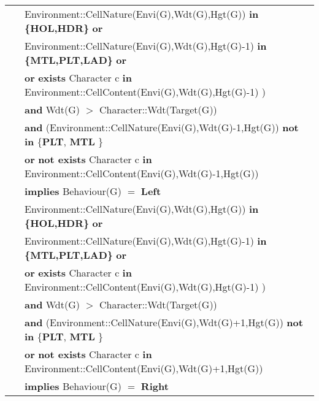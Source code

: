 \documentclass{article}
\begin{document}
\begin{tabular}{rl}
& \textrm{Environment::CellNature(Envi(G),Wdt(G),Hgt(G))} \textbf{in} \textbf{ \{HOL,HDR\}} \textbf{or}  \\
& \quad \textrm{Environment::CellNature(Envi(G),Wdt(G),Hgt(G)-1)} \textbf{in} \textbf{\{MTL,PLT,LAD\}} \textbf{or}  \\
& \quad \textbf{or} \textbf{exists} \textrm{Character} c \textbf{in} \textrm{Environment::CellContent(Envi(G),Wdt(G),Hgt(G)-1)} ) \\\

& \quad\quad \textbf{and} \textrm{Wdt(G)} $>$ \textrm{Character::Wdt(Target(G))} \\
& \quad\quad \textbf{and} (\textrm{Environment::CellNature(Envi(G),Wdt(G)-1,Hgt(G))} \textbf{not in} \{\textbf{PLT}, \textbf{MTL}  \} \\
& \quad\quad\quad\quad \textbf{or} \textbf{not exists} \textrm{Character} c \textbf{in} \textrm{Environment::CellContent(Envi(G),Wdt(G)-1,Hgt(G))} \\
& \quad\quad \textbf{implies} \textrm{Behaviour(G)} $=$ \textbf{Left} \\


& \textrm{Environment::CellNature(Envi(G),Wdt(G),Hgt(G))} \textbf{in} \textbf{ \{HOL,HDR\}} \textbf{or}  \\

& \quad \textrm{Environment::CellNature(Envi(G),Wdt(G),Hgt(G)-1)} \textbf{in} \textbf{\{MTL,PLT,LAD\}} \textbf{or}  \\

& \quad \textbf{or} \textbf{exists} \textrm{Character} c \textbf{in} \textrm{Environment::CellContent(Envi(G),Wdt(G),Hgt(G)-1)} ) \\\

& \quad\quad \textbf{and} \textrm{Wdt(G)} $>$ \textrm{Character::Wdt(Target(G))} \\
& \quad\quad \textbf{and} (\textrm{Environment::CellNature(Envi(G),Wdt(G)+1,Hgt(G))} \textbf{not in} \{\textbf{PLT}, \textbf{MTL}  \} \\
& \quad\quad\quad\quad \textbf{or} \textbf{not exists} \textrm{Character} c \textbf{in} \textrm{Environment::CellContent(Envi(G),Wdt(G)+1,Hgt(G))} \\
& \quad\quad \textbf{implies} \textrm{Behaviour(G)} $=$ \textbf{Right} \\



\end{tabular}
\end{document}
